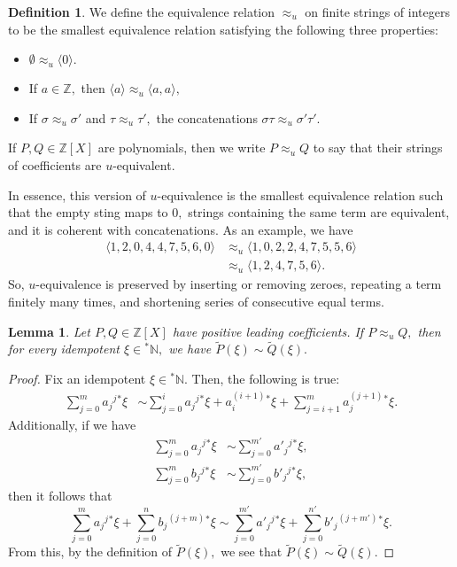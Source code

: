 \documentclass[12pt]{amsart}
\newcommand{\stt}{{}^*}
\newcommand{\NN}{\mathbb{N}}
\newcommand{\ZZ}{\mathbb{Z}}
\theoremstyle{plain}
\newtheorem{lemma}[thm]{Lemma}
\theoremstyle{definition}
\newtheorem{defn}[thm]{Definition}
\theoremstyle{remark}
\theoremstyle{theorem}
\numberwithin{equation}{section}
\numberwithin{thm}{section}
\begin{document}
\begin{defn}
We define the equivalence relation $\approx_u$ on finite strings of integers to be the smallest equivalence relation satisfying the following three properties:
\begin{itemize}
    \item $\emptyset \approx_u \langle 0 \rangle.$
    \item If $a \in \ZZ,$ then $\langle a \rangle \approx_u \langle a, a \rangle,$
    \item If $\sigma \approx_u \sigma '$ and $\tau \approx_u \tau ',$ the concatenations $\sigma \tau \approx_u \sigma ' \tau '.$
\end{itemize}
If $P,Q \in \ZZ[X]$ are polynomials, then we write $P \approx_u Q$ to say that their strings of coefficients are $u$-equivalent.
\end{defn}
In essence, this version of $u$-equivalence is the smallest equivalence relation such that the empty sting maps to $0,$ strings containing the same term are equivalent, and it is coherent with concatenations. As an example, we have
\begin{align*}
    \langle 1,2,0,4,4,7,5,6,0 \rangle & \approx_u \langle 1,0,2,2,4,7,5,5,6\rangle \\
    &\approx_u \langle 1,2,4,7,5,6\rangle .
\end{align*}
So, $u$-equivalence is preserved by inserting or removing zeroes, repeating a term finitely many times, and shortening series of consecutive equal terms.
\begin{lemma} \label{107}
Let $P,Q \in \ZZ[X]$ have positive leading coefficients. If $P \approx_u Q,$ then for every idempotent $\xi \in \stt \NN,$ we have $\tilde{P}(\xi) \sim \tilde{Q}(\xi).$
\end{lemma}
\begin{proof}
Fix an idempotent $\xi \in \stt \NN.$ Then, the following is true:
\begin{align*}
    \sum_{j=0}^m a_j {}^j \stt \xi &\sim \sum_{j=0}^i a_j {}^j \stt \xi + a_i^{(i+1)}\stt \xi + \sum_{j=i+1}^m a_j^{(j+1)} \stt \xi.
\end{align*}
Additionally, if we have
\begin{align*}
    \sum_{j=0}^m a_j {}^j\stt \xi &\sim \sum_{j=0}^{m'}a'_j {}^j \stt \xi, \\
    \sum_{j=0}^m b_j {}^j\stt \xi &\sim \sum_{j=0}^{m'}b'_j {}^j \stt \xi,
\end{align*}
then it follows that 
\[ \sum_{j=0}^m a_j {}^j\stt \xi + \sum_{j=0}^n b_j {}^{(j+m)}\stt \xi \sim \sum_{j=0}^{m'} a'_j {}^j\stt \xi + \sum_{j=0}^{n'} b'_j {}^{(j+m')}\stt \xi.\]
From this, by the definition of $\tilde{P}(\xi),$ we see that $\tilde{P}(\xi) \sim \tilde{Q}(\xi).$
\end{proof}
\end{document}
